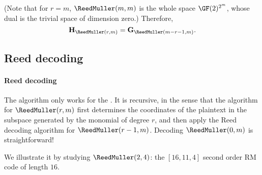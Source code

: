 \documentclass[a4paper, 11pt, openany]{book}
\begin{document}
(Note that for $r = m$, $\ReedMuller(m,m)$ is the whole space $\GF(2)^{2^m}$, whose dual is the trivial space of dimension zero.) Therefore,
\[
	{\bf H}_{\ReedMuller(r,m)} = {\bf G}_{\ReedMuller(m-r-1,m)}.
\]



\subsection{Reed decoding}

\paragraph{Reed decoding}
The  algorithm only works for the . It is recursive, in the sense that the algorithm for $\ReedMuller(r,m)$ first determines the coordinates of the plaintext in the subspace generated by the monomial of degree $r$, and then apply the Reed decoding algorithm for $\ReedMuller(r-1,m)$. Decoding $\ReedMuller(0,m)$ is straightforward!

We illustrate it by studying $\ReedMuller(2,4)$: the $[16,11,4]$ second order RM code of length $16$.
\end{document}
